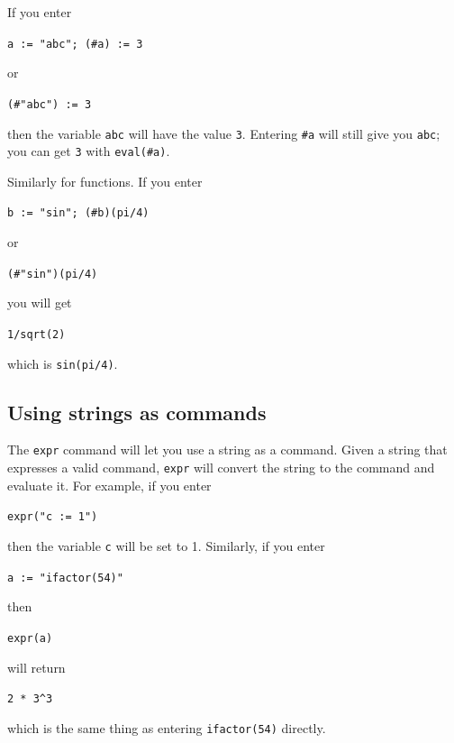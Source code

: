 \documentclass[a4paper,11pt]{book}
\begin{document}
If you enter
\begin{center}
  {\tt a := "abc"; (\#a) := 3}
\end{center}
or
\begin{center}
  {\tt (\#"abc") := 3}
\end{center}
then the variable \texttt{abc} will have the value \texttt{3}.
Entering \texttt{\#a} will still give you \texttt{abc}; you can get
\texttt{3} with \texttt{eval(\#a)}.

Similarly for functions.  If you enter
\begin{center}
  {\tt b := "sin"; (\#b)(pi/4)}
\end{center}
or
\begin{center}
  {\tt (\#"sin")(pi/4)}
\end{center}
you will get
\begin{center}
  {\tt 1/sqrt(2)}
\end{center}
which is {\tt sin(pi/4)}.

\subsection{Using strings as commands}

The \texttt{expr} command will let you use a string as a
command.  Given a string that expresses a valid command, \texttt{expr}
will convert the string to the command and evaluate it.  
For example, if you enter
\begin{center}
  {\tt expr("c := 1")}
\end{center}
then the variable \texttt{c} will be set to 1.  
Similarly, if you enter
\begin{center}
  {\tt a := "ifactor(54)"}
\end{center}
then
\begin{center}
  {\tt expr(a)}
\end{center}
will return
\begin{center}
  {\tt 2 * 3\^{}3}
\end{center}
which is the same thing as entering \texttt{ifactor(54)} directly.
\end{document}
